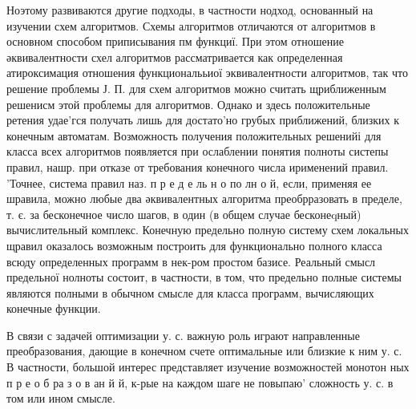 \documentclass[10pt]{article}
\begin{document}
Ноэтому развиваются другие подходы, в частности нодход, основанный на изучении схем алгоритмов. Схемы алгоритмов отличаются от алгоритмов в основном способом приписывания пм функциї. При этом отношение әквивалентности схел алгоритмов рассматривается как определенная атироксимация отношения функциональьиої эквивалентности алгоритмов, так что решение проблемы Ј. П. для схем алгоритмов можно считать щриближенным решенисм этой проблемы для алгоритмов. Однако и здесь положительные ретения удае'гся получать лишь для достато'но грубых приближений, близких к конечным автоматам. Возможность получения положительных решенийі для класса всех алгоритмов появляется при ослаблении понятия полноты систепы правил, нашр. при отказе от требования конечного числа ирименений правил. 'Точнее, система правил наз. п р е д е ль н о по лн о й, если, применяя ее шравила, можно любые два әквивалентных алгоритма преобрразовать в пределе, т. є. за бесконечное число шагов, в один (в общем случае бесконеqный) вычислительный комплекс. Конечную предельно полную систему схем локальных щравил оказалось возможным построить для функционально полного класса всюду определенных программ в нек-ром простом базисе. Реальный смысл предельної нолноты состоит, в частности, в том, что предельно полные системы являются полными в обычном смысле для класса программ, вычисляющих конечные функции.



В связи с задачей оптимизации у. с. важную роль играют направленные преобразования, дающие в конечном счете оптимальные или близкие к ним у. с. В частности, большой интерес представляет изучение возможностей монотон ных п р е о б ра з о в ан й й, к-рые на каждом шаге не повыпаю' сложность у. с. в том или ином смысле.
\end{document}
